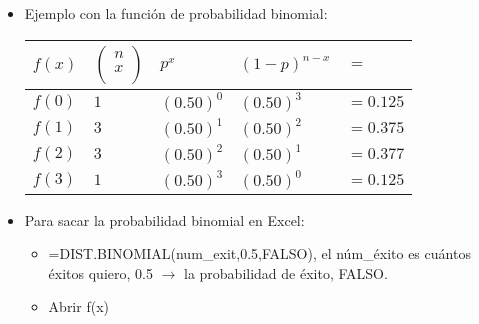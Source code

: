 \begin{itemize}
    \item Ejemplo con la función de probabilidad binomial:
        \begin{center}
           \begin{tabular}{ | p{1.5cm} | p{1.5cm} | p{1.5cm} | p{1.5cm} | p{1.5cm} | }
               \hline
                   $f(x)$ & $\left(\begin{matrix} n \\ x \\ \end{matrix}\right)$ & $p^x$  & $(1-p)^{n-x}$  & $=$  \\
               \hline
                    $f(0)$  & $1$ & $(0.50)^0$ & $(0.50)^3$ & $= 0.125$  \\ 
                    $f(1)$  & $3$ & $(0.50)^1$ & $(0.50)^2$ & $= 0.375$  \\ 
                    $f(2)$  & $3$ & $(0.50)^2$ & $(0.50)^1$ & $= 0.377$  \\ 
                    $f(3)$  & $1$ & $(0.50)^3$ & $(0.50)^0$ & $= 0.125$  \\ 
                \hline
           \end{tabular}
        \end{center}
    
    \item Para sacar la probabilidad binomial en Excel: 
        \begin{itemize}[label=$\downarrow$]
           \item =DIST.BINOMIAL(num\_exit,0.5,FALSO), el núm\_éxito es cuántos éxitos quiero, 0.5 $\rightarrow$ la probabilidad de éxito, FALSO.
           \item Abrir f(x)
        \end{itemize}
\end{itemize}

